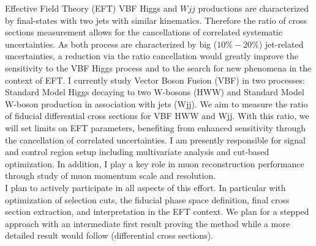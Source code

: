 Effective Field Theory (EFT) VBF Higgs and $Wjj$ productions are characterized by final-states with two jets with similar kinematics. Therefore the ratio of cross sections measurement allows for the cancellations of correlated systematic uncertainties. As both process are characterized by big ($10\%-20\%$) jet-related uncertainties, a reduction via the ratio cancellation would greatly improve the sensitivity to the VBF Higgs process and to the search for new phenomena in the context of EFT.  I currently study Vector Boson Fusion (VBF) in two processes: Standard Model Higgs decaying to two W-bosons (HWW) and Standard Model W-boson production in association with jets (Wjj). We aim to measure the ratio of fiducial differential cross sections for VBF HWW and Wjj. With this ratio, we will set limits on EFT parameters, benefiting from enhanced sensitivity through the cancellation of correlated uncertainties. I am presently responsible for signal and control region setup including multivariate analysis and cut-based optimization. In addition, I play a key role in muon reconstruction performance through study of muon momentum scale and resolution.\\

I plan to actively participate in all aspects of this effort. In particular with optimization of selection cuts, the fiducial phase space definition, final cross section extraction, and interpretation in the EFT context. We plan for a stepped approach with an intermediate first result proving the method while a more detailed result would follow (differential cross sections). 
